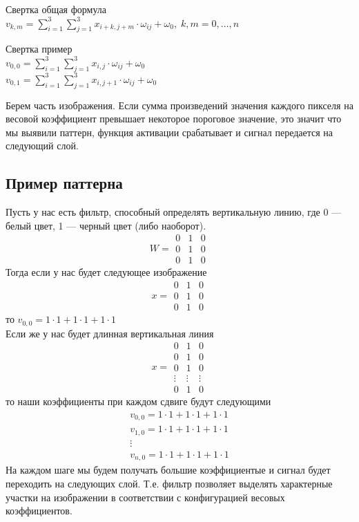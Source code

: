 \documentclass{article}
\begin{document}
	Свертка общая формула\\
	$v_{k,m} = \sum\limits_{i=1}^{3} \sum\limits_{j=1}^{3} x_{i+k, j+m} \cdot \omega_{ij} + \omega_0, \; k,m = 0, \dots, n$
	
	Свертка пример\\
	$v_{0,0} = \sum\limits_{i=1}^{3} \sum\limits_{j=1}^{3} x_{i,j} \cdot \omega_{ij} + \omega_0$\\
	$v_{0,1} = \sum\limits_{i=1}^{3} \sum\limits_{j=1}^{3} x_{i,j+1} \cdot \omega_{ij} + \omega_0$
	
	Берем часть изображения. Если сумма произведений значения каждого пикселя на весовой коэффициент превышает некоторое пороговое значение, это значит что мы выявили паттерн, функция активации срабатывает и сигнал передается на следующий слой.\\
	
	\subsection{Пример паттерна}
	
	Пусть у нас есть фильтр, способный определять вертикальную линию, где 0 --- белый цвет, 1 --- черный цвет (либо наоборот).
	$$W = \begin{matrix}
		0 & 1 & 0\\
		0 & 1 & 0\\
		0 & 1 & 0
	\end{matrix}$$
	Тогда если у нас будет следующее изображение
	$$x = \begin{matrix}
		0 & 1 & 0\\
		0 & 1 & 0\\
		0 & 1 & 0
	\end{matrix}$$
	то
	$v_{0,0} = 1 \cdot 1 + 1 \cdot 1 + 1 \cdot 1$\\
	Если же у нас будет длинная вертикальная линия
		$$x = \begin{matrix}
		0 & 1 & 0\\
		0 & 1 & 0\\
		0 & 1 & 0\\
		\vdots & \vdots & \vdots\\
		0 & 1 & 0
	\end{matrix}$$
	то наши коэффициенты при каждом сдвиге будут следующими
	\begin{align*}
		v_{0,0} = 1 \cdot 1 + 1 \cdot 1 + 1 \cdot 1\\
		v_{1,0} = 1 \cdot 1 + 1 \cdot 1 + 1 \cdot 1\\
		\vdots\\
		v_{n,0} = 1 \cdot 1 + 1 \cdot 1 + 1 \cdot 1
	\end{align*}
	На каждом шаге мы будем получать большие коэффициентые и сигнал будет переходить на следующих слой. Т.е. фильтр позволяет выделять характерные участки на изображении в соответствии с конфигурацией весовых коэффициентов.
	
\end{document}
